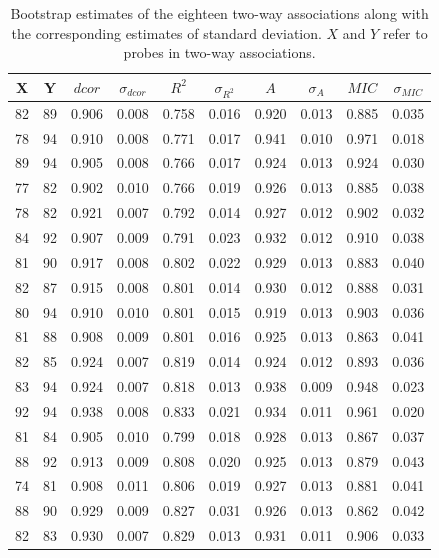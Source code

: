 \documentclass[a4paper, 12pt]{report}
\begin{document}
\begin{table}[h]
\begin{centering}
\begin{tabular}{cccccccccc}%
  \hline
  X & Y & $dcor$ & $\sigma_{dcor}$ & $R^2$ & $\sigma_{R^2}$ & $A$ & $\sigma_{A}$ & $MIC$ & $\sigma_{MIC}$ \\ 
  \hline
 82 & 89 & 0.906 & 0.008 & 0.758 & 0.016 & 0.920 & 0.013 & 0.885 & 0.035 \\ 
 78 & 94 & 0.910 & 0.008 & 0.771 & 0.017 & 0.941 & 0.010 & 0.971 & 0.018 \\ 
 89 & 94 & 0.905 & 0.008 & 0.766 & 0.017 & 0.924 & 0.013 & 0.924 & 0.030 \\ 
 77 & 82 & 0.902 & 0.010 & 0.766 & 0.019 & 0.926 & 0.013 & 0.885 & 0.038 \\ 
 78 & 82 & 0.921 & 0.007 & 0.792 & 0.014 & 0.927 & 0.012 & 0.902 & 0.032 \\ 
  84 & 92 & 0.907 & 0.009 & 0.791 & 0.023 & 0.932 & 0.012 & 0.910 & 0.038 \\ 
 81 & 90 & 0.917 & 0.008 & 0.802 & 0.022 & 0.929 & 0.013 & 0.883 & 0.040 \\ 
 82 & 87 & 0.915 & 0.008 & 0.801 & 0.014 & 0.930 & 0.012 & 0.888 & 0.031 \\ 
 80 & 94 & 0.910 & 0.010 & 0.801 & 0.015 & 0.919 & 0.013 & 0.903 & 0.036 \\ 
  81 & 88 & 0.908 & 0.009 & 0.801 & 0.016 & 0.925 & 0.013 & 0.863 & 0.041 \\ 
  82 & 85 & 0.924 & 0.007 & 0.819 & 0.014 & 0.924 & 0.012 & 0.893 & 0.036 \\ 
  83 & 94 & 0.924 & 0.007 & 0.818 & 0.013 & 0.938 & 0.009 & 0.948 & 0.023 \\ 
  92 & 94 & 0.938 & 0.008 & 0.833 & 0.021 & 0.934 & 0.011 & 0.961 & 0.020 \\ 
  81 & 84 & 0.905 & 0.010 & 0.799 & 0.018 & 0.928 & 0.013 & 0.867 & 0.037 \\ 
  88 & 92 & 0.913 & 0.009 & 0.808 & 0.020 & 0.925 & 0.013 & 0.879 & 0.043 \\ 
  74 & 81 & 0.908 & 0.011 & 0.806 & 0.019 & 0.927 & 0.013 & 0.881 & 0.041 \\ 
  88 & 90 & 0.929 & 0.009 & 0.827 & 0.031 & 0.926 & 0.013 & 0.862 & 0.042 \\ 
  82 & 83 & 0.930 & 0.007 & 0.829 & 0.013 & 0.931 & 0.011 & 0.906 & 0.033 \\ 
   \hline
\end{tabular}
\caption{Bootstrap estimates of the eighteen two-way associations along with the corresponding estimates of standard deviation. $X$ and $Y$ refer to probes in two-way associations.} 
\label{T:2wayAssociations}
\end{centering}
\end{table}
\end{document}

